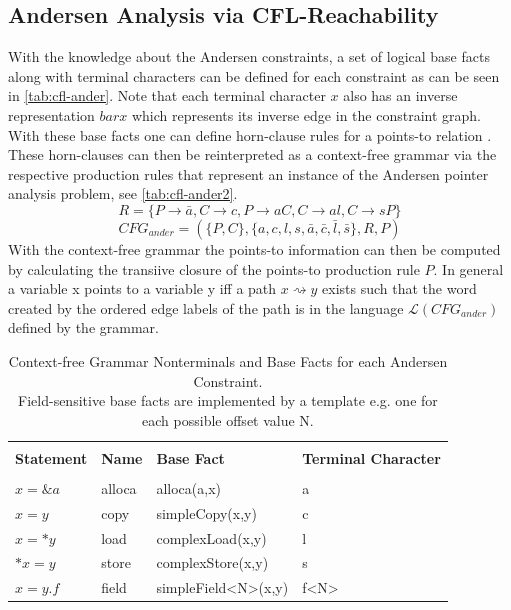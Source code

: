 \subsection{Andersen Analysis via CFL-Reachability}\label{sec:ander-cfl}
With the knowledge about the Andersen constraints, a set of logical base facts along with terminal characters can be defined for each constraint as can be seen in \autoref{tab:cfl-ander}. Note that each terminal character $x$ also has an inverse representation $bar{x}$ which represents its inverse edge in the constraint graph.
With these base facts one can define horn-clause rules for a points-to relation \cite{reps1998program}. These horn-clauses can then be reinterpreted as a context-free grammar via the respective production rules that represent an instance of the Andersen pointer analysis problem, see \autoref{tab:cfl-ander2}.
$$R=\{P\rightarrow \bar{a}, C \rightarrow c, P\rightarrow aC, C\rightarrow al, C\rightarrow sP\}$$
$$CFG_{ander}=(\{P,C\}, \{a,c,l,s,\bar{a},\bar{c},\bar{l},\bar{s}\}, R, P)$$
With the context-free grammar the points-to information can then be computed by calculating the transiive closure of the points-to production rule $P$. In general a variable x points to a variable y iff a path $x \rightsquigarrow y$ exists such that the word created by the ordered edge labels of the path is in the language $\mathcal{L}(CFG_{ander})$ defined by the grammar.
\begin{table}
    \begin{center}
        \caption{Context-free Grammar Nonterminals and Base Facts for each Andersen Constraint.\\Field-sensitive base facts are implemented by a template e.g. one for each possible offset value N.}
        \label{tab:cfl-ander}
        \begin{tabular}{l|l|l|l}
            \hline                                                                                 \\
            \textbf{Statement} & \textbf{Name} & \textbf{Base Fact}  & \textbf{Terminal Character} \\
            \hline                                                                                 \\
            $x = \&a$          & alloca        & alloca(a,x)         & a                           \\
            $x = y$            & copy          & simpleCopy(x,y)     & c                           \\
            $x = *y$           & load          & complexLoad(x,y)    & l                           \\
            $*x = y$           & store         & complexStore(x,y)   & s                           \\
            $x = y.f$          & field         & simpleField<N>(x,y) & f<N>                        \\
        \end{tabular}
    \end{center}
\end{table}

